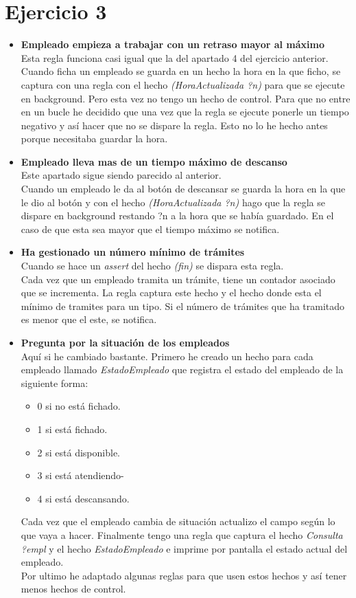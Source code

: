 \documentclass[10pt,spanish]{article}
\begin{document}
	\section{Ejercicio 3}
	\begin{itemize}
		\item \textbf{Empleado empieza a trabajar con un retraso mayor al máximo}\\
		Esta regla funciona casi igual que la del apartado 4 del ejercicio anterior.
		\\Cuando ficha un empleado se guarda en un hecho la hora en la que ficho, se captura con una regla con el hecho \textit{(HoraActualizada ?n)} para que se ejecute en background. Pero esta vez no tengo un hecho de control. Para que no entre en un bucle he decidido que una vez que la regla se ejecute ponerle un tiempo negativo y así hacer que no se dispare la regla.
		Esto no lo he hecho antes porque necesitaba guardar la hora.
		\item \textbf{Empleado lleva mas de un tiempo máximo de descanso}\\
		Este apartado sigue siendo parecido al anterior.
		\\Cuando un empleado le da al botón de descansar se guarda la hora en la que le dio al botón y con el hecho \textit{(HoraActualizada ?n)} hago que la regla se dispare en background restando ?n a la hora que se había guardado. En el caso de que esta sea mayor que el tiempo máximo se notifica.
		\item \textbf{Ha gestionado un número mínimo de trámites}\\
		Cuando se hace un \textit{assert} del hecho \textit{(fin)} se dispara esta regla.\\
		Cada vez que un empleado tramita un trámite, tiene un contador asociado que se incrementa.
		La regla captura este hecho y el hecho donde esta el mínimo de tramites para un tipo. Si el número de trámites que ha tramitado es menor que el este, se notifica.
		\item \textbf{Pregunta por la situación de los empleados}\\
		Aquí si he cambiado bastante. Primero he creado un hecho para cada empleado llamado \textit{EstadoEmpleado} que registra el estado del empleado de la siguiente forma:
		\begin{itemize}
			\item 0 si no está fichado.
			\item 1 si está fichado.
			\item 2 si está disponible.
			\item 3 si está atendiendo-
			\item 4 si está descansando.
		\end{itemize}
		Cada vez que el empleado cambia de situación actualizo el campo según lo que vaya a hacer.
		Finalmente tengo una regla que captura el hecho \textit{Consulta ?empl} y el hecho \textit{EstadoEmpleado} e imprime por pantalla el estado actual del empleado. \\
		Por ultimo he adaptado algunas reglas para que usen estos hechos y así tener menos hechos de control.
	\end{itemize}
\end{document}
